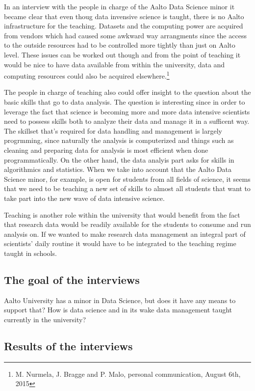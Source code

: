 In an interview with the people in charge of the Aalto Data Science minor
it became clear that even thoug data invensive science is taught, there is no
Aalto infrastructure for the teaching. Datasets and the computing power are
acquired from vendors which had caused some awkward way arrangments since the
access to the outside resources had to be controlled more tightly than just
on Aalto level. These issues can be worked out though and from the point of
teaching it would be nice to have data available from within the university,
data and computing resources could also be acquired elsewhere.\footnote{M. Nurmela,
J. Bragge and P. Malo, personal communication, August 6th, 2015}

The people in charge of teaching also could offer insight to the question about
the basic skills that go to data analysis. The question is interesting since
in order to leverage the fact that science is becoming more and more data
intensive scientists need to possess skills both to analyze their data and
manage it in a sufficent way. The skillset that's required for data handling
and management is largely progrmming, since naturally the analysis is
computerized and things such as cleaning and preparing data for analysis is
most efficient when done programmatically. On the other hand, the data analyis
part asks for skills in algorithmics and statistics. When we take into account
that the Aalto Data Science minor, for example, is open for students from all
fields of science, it seems that we need to be teaching a new set of skills to
almost all students that want to take part into the new wave of data intensive
science.

\iffalse

Teaching is another role within the university that would benefit from the fact
that research data would be readily available for the students to consume and
run analysis on. If we wanted to make research data management an integral part
of scientists' daily routine it would have to be integrated to the teaching
regime taught in schools.

\subsection{The goal of the interviews}

Aalto University has a minor in Data Science, but does it have any means to
support that? How is data science and in its wake data management taught
currently in the university?

\subsection{Results of the interviews}


